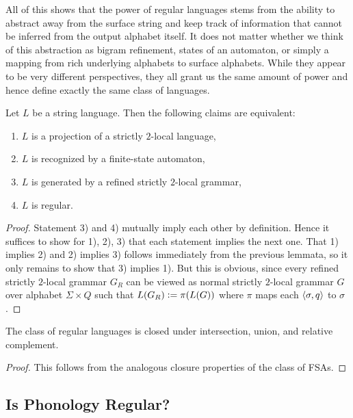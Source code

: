 All of this shows that the power of regular languages stems from the ability to abstract away from the surface string and keep track of information that cannot be inferred from the output alphabet itself.
It does not matter whether we think of this abstraction as bigram refinement, states of an automaton, or simply a mapping from rich underlying alphabets to surface alphabets.
While they appear to be very different perspectives, they all grant us the same amount of power and hence define exactly the same class of languages.
%
\begin{theorem}
    Let $L$ be a string language.
    Then the following claims are equivalent:
    \begin{enumerate}
        \item $L$ is a projection of a strictly $2$-local language,
        \item $L$ is recognized by a finite-state automaton,
        \item $L$ is generated by a refined strictly $2$-local grammar,
        \item $L$ is regular.
    \end{enumerate}
\end{theorem}
%
\begin{proof}
    Statement 3) and 4) mutually imply each other by definition.
    Hence it suffices to show for 1), 2), 3) that each statement implies the next one.
    That 1) implies 2) and 2) implies 3) follows immediately from the previous lemmata, so it only remains to show that 3) implies 1).
    But this is obvious, since every refined strictly $2$-local grammar $G_R$ can be viewed as normal strictly $2$-local grammar $G$ over alphabet $\Sigma \times Q$ such that $L(G_R) \mathrel{\mathop:}= \pi(L(G))$ where $\pi$ maps each $\left \langle \sigma,q \right \rangle $ to $\sigma$.
\end{proof}

\begin{corollary}
    The class of regular languages is closed under intersection, union, and relative complement.
\end{corollary}
%
\begin{proof}
    This follows from the analogous closure properties of the class of FSAs.    
\end{proof}

\subsection{Is Phonology Regular?}

